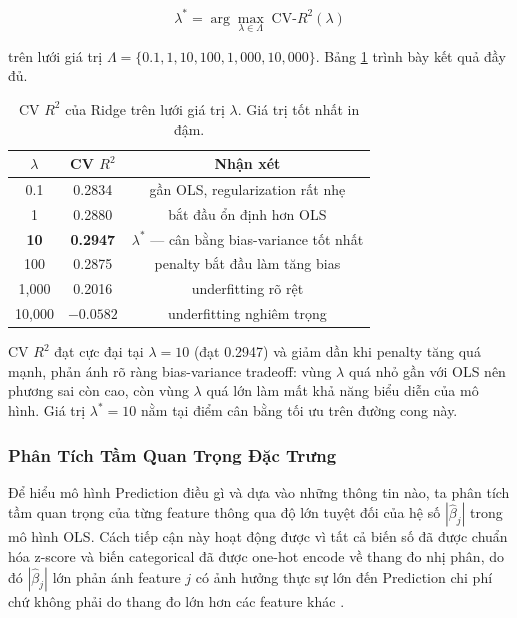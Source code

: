 \begin{equation}
    \lambda^* = \arg\max_{\lambda \in \Lambda}\; \text{CV-}R^2(\lambda)
\end{equation}

trên lưới giá trị $\Lambda = \{0.1, 1, 10, 100, 1{,}000, 10{,}000\}$. Bảng \ref{tab:lambda_selection} trình bày kết quả đầy đủ.

\begin{table}[H]
\centering
\caption{CV $R^2$ của Ridge trên lưới giá trị $\lambda$. Giá trị tốt nhất in đậm.}
\label{tab:lambda_selection}
\begin{tabular}{@{}ccc@{}}
\toprule
$\lambda$ & CV $R^2$ & Nhận xét \\
\midrule
0.1       & 0.2834   & gần OLS, regularization rất nhẹ \\
1         & 0.2880   & bắt đầu ổn định hơn OLS \\
\textbf{10} & \textbf{0.2947} & $\lambda^*$ --- cân bằng bias-variance tốt nhất \\
100       & 0.2875   & penalty bắt đầu làm tăng bias \\
1{,}000   & 0.2016   & underfitting rõ rệt \\
10{,}000  & $-0.0582$ & underfitting nghiêm trọng \\
\bottomrule
\end{tabular}
\end{table}

CV $R^2$ đạt cực đại tại $\lambda = 10$ (đạt 0.2947) và giảm dần khi penalty tăng quá mạnh, phản ánh rõ ràng bias-variance tradeoff: vùng $\lambda$ quá nhỏ gần với OLS nên phương sai còn cao, còn vùng $\lambda$ quá lớn làm mất khả năng biểu diễn của mô hình. Giá trị $\lambda^* = 10$ nằm tại điểm cân bằng tối ưu trên đường cong này.

\subsubsection{Phân Tích Tầm Quan Trọng Đặc Trưng}

Để hiểu mô hình Prediction điều gì và dựa vào những thông tin nào, ta phân tích tầm quan trọng của từng feature thông qua độ lớn tuyệt đối của hệ số $|\hat{\beta}_j|$ trong mô hình OLS. Cách tiếp cận này hoạt động được vì tất cả biến số đã được chuẩn hóa z-score và biến categorical đã được one-hot encode về thang đo nhị phân, do đó $|\hat{\beta}_j|$ lớn phản ánh feature $j$ có ảnh hưởng thực sự lớn đến Prediction chi phí chứ không phải do thang đo lớn hơn các feature khác \cite{james2013}.

